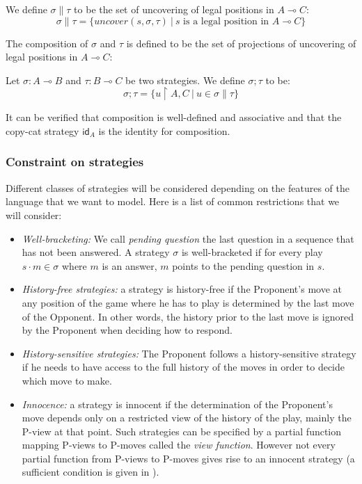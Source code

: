 We define $\sigma \| \tau $ to be the set of uncovering of legal
positions in $A \multimap C$:
$$ \sigma \| \tau = \{ uncover(s, \sigma, \tau) \ | \ s \mbox{ is a legal position in } A \multimap C \}$$

The composition of $\sigma$ and $\tau$ is defined to be the set of
projections of uncovering of legal positions in $A \multimap C$:

\begin{dfn}
Let $\sigma : A \multimap B$ and  $\tau : B \multimap C$ be two
strategies. We define $\sigma ; \tau$ to be:
$$ \sigma ; \tau = \{ u \upharpoonright A,C \ | \ u \in \sigma \|
\tau \}$$
\end{dfn}

It can be verified that composition is well-defined and associative
\citep{hylandong_pcf} and that the copy-cat strategy $\textsf{id}_A$ is the identity for composition.

\subsubsection{Constraint on strategies}

Different classes of strategies will be considered depending on the
features of the language that we want to model. Here is a list of
common restrictions that we will consider:
\begin{itemize}
\item \emph{Well-bracketing:}
We call \emph{pending question} the last question in a sequence that has not been answered.
A strategy $\sigma$ is well-bracketed if for every play $s \cdot m \in \sigma$ where $m$ is an answer, $m$ points to the pending question in $s$.

\item \emph{History-free strategies:} a strategy is history-free if the Proponent's move at any position of the game where he has to play
is determined by the last move of the Opponent. In other words, the
history prior to the last move is ignored by the Proponent when
deciding how to respond.

\item \emph{History-sensitive strategies:} The Proponent follows a history-sensitive strategy if he needs to have access to the full
history of the moves in order to decide which move to make.

\item \emph{Innocence:} a strategy is innocent if the determination of the Proponent's move depends
only on a restricted view of the history of the play, mainly the
P-view at that point. Such strategies can be specified by a partial
function mapping P-views to P-moves called the \emph{view function}.
However not every partial function from P-views to P-moves gives
rise to an innocent strategy (a sufficient condition is given in
\cite{hylandong_pcf}).
\end{itemize}

